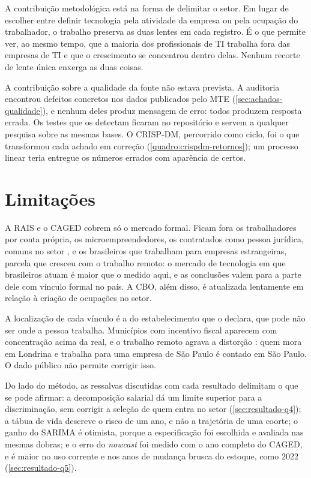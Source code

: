 A contribuição metodológica está na forma de delimitar o setor. Em lugar de escolher entre definir tecnologia pela atividade da empresa ou pela ocupação do trabalhador, o trabalho preserva as duas lentes em cada registro. É o que permite ver, ao mesmo tempo, que a maioria dos profissionais de TI trabalha fora das empresas de TI e que o crescimento se concentrou dentro delas. Nenhum recorte de lente única enxerga as duas coisas.

A contribuição sobre a qualidade da fonte não estava prevista. A auditoria encontrou defeitos concretos nos dados publicados pelo MTE (\autoref{sec:achados-qualidade}), e nenhum deles produz mensagem de erro: todos produzem resposta errada. Os testes que os detectam ficaram no repositório e servem a qualquer pesquisa sobre as mesmas bases. O CRISP-DM, percorrido como ciclo, foi o que transformou cada achado em correção (\autoref{quadro:crispdm-retornos}); um processo linear teria entregue os números errados com aparência de certos.

\section{Limitações}
\label{sec:limitacoes-metodo}

A RAIS e o CAGED cobrem só o mercado formal. Ficam fora os trabalhadores por conta própria, os microempreendedores, os contratados como pessoa jurídica, comuns no setor \cite{IPEA2023}, e os brasileiros que trabalham para empresas estrangeiras, parcela que cresceu com o trabalho remoto: o mercado de tecnologia em que brasileiros atuam é maior que o medido aqui, e as conclusões valem para a parte dele com vínculo formal no país. A CBO, além disso, é atualizada lentamente em relação à criação de ocupações no setor.

A localização de cada vínculo é a do estabelecimento que o declara, que pode não ser onde a pessoa trabalha. Municípios com incentivo fiscal aparecem com concentração acima da real, e o trabalho remoto agrava a distorção \cite{Barrero2023}: quem mora em Londrina e trabalha para uma empresa de São Paulo é contado em São Paulo. O dado público não permite corrigir isso.

Do lado do método, as ressalvas discutidas com cada resultado delimitam o que se pode afirmar: a decomposição salarial dá um limite superior para a discriminação, sem corrigir a seleção de quem entra no setor (\autoref{sec:resultado-q4}); a tábua de vida descreve o risco de um ano, e não a trajetória de uma coorte; o ganho do SARIMA é otimista, porque a especificação foi escolhida e avaliada nas mesmas dobras; e o erro do \textit{nowcast} foi medido com o ano completo do CAGED, e é maior no uso corrente e nos anos de mudança brusca do estoque, como 2022 (\autoref{sec:resultado-q5}).

